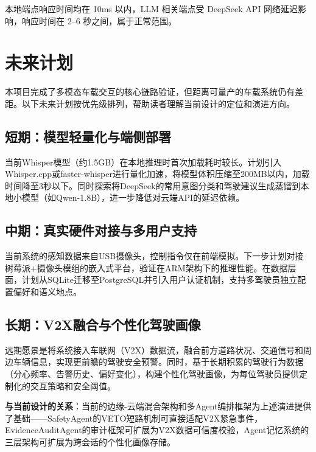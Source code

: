 \documentclass[a4paper]{article}
\begin{document}
本地端点响应时间均在 10ms 以内，LLM 相关端点受 DeepSeek API 网络延迟影响，响应时间在 2--6 秒之间，属于正常范围。

\section{未来计划}

本项目完成了多模态车载交互的核心链路验证，但距离可量产的车载系统仍有差距。以下未来计划按优先级排列，帮助读者理解当前设计的定位和演进方向。

\subsection{短期：模型轻量化与端侧部署}

当前Whisper模型（约1.5GB）在本地推理时首次加载耗时较长。计划引入Whisper.cpp或faster-whisper进行量化加速，将模型体积压缩至200MB以内，加载时间降至3秒以下。同时探索将DeepSeek的常用意图分类和驾驶建议生成蒸馏到本地小模型（如Qwen-1.8B），进一步降低对云端API的延迟依赖。

\subsection{中期：真实硬件对接与多用户支持}

当前系统的感知数据来自USB摄像头，控制指令仅在前端模拟。下一步计划对接树莓派+摄像头模组的嵌入式平台，验证在ARM架构下的推理性能。在数据层面，计划从SQLite迁移至PostgreSQL并引入用户认证机制，支持多驾驶员独立配置偏好和语义地点。

\subsection{长期：V2X融合与个性化驾驶画像}

远期愿景是将系统接入车联网（V2X）数据流，融合前方道路状况、交通信号和周边车辆信息，实现更前瞻的驾驶安全预警。同时，基于长期积累的驾驶行为数据（分心频率、告警历史、偏好变化），构建个性化驾驶画像，为每位驾驶员提供定制化的交互策略和安全阈值。

\textbf{与当前设计的关系}：当前的边缘-云端混合架构和多Agent编排框架为上述演进提供了基础——SafetyAgent的VETO短路机制可直接适配V2X紧急事件，EvidenceAuditAgent的审计框架可扩展为V2X数据可信度校验，Agent记忆系统的三层架构可扩展为跨会话的个性化画像存储。
\end{document}
